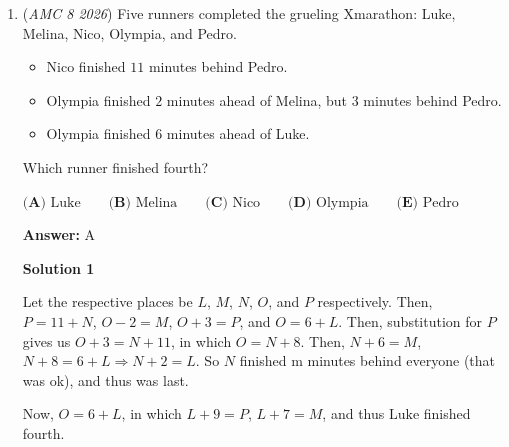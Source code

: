 \begin{enumerate}
 



\textbf{Solution 5}

Since $\sqrt[3]{81} = 3$, and $\sqrt{16} = 4$, the numerator of $\frac{\sqrt{16\sqrt{81}}}{\sqrt{81\sqrt{16}}}$ becomes $4 \cdot 3 = 12$. To find the denominator's value, we know that $\sqrt[3]{16} = 2$, and that $\sqrt{81} = 9$, the denominator of $\frac{\sqrt{16\sqrt{81}}}{\sqrt{81\sqrt{16}}}$ yields $9 \cdot 2 = 18$. We are left with $\frac{12}{18}$. After further simplification, our answer is $\boxed{ \textbf{(B) } \frac{2}{3}}$.~Ingeniouspeacock36

 


	\item (\textit{AMC 8 2026}) Five runners completed the grueling Xmarathon: Luke, Melina, Nico, Olympia, and Pedro.


 
            \begin{itemize}
        \item Nico finished $11$ minutes behind Pedro.
            \end{itemize}
            
            \begin{itemize}
        \item Olympia finished $2$ minutes ahead of Melina, but $3$ minutes behind Pedro.
            \end{itemize}
            
            \begin{itemize}
        \item Olympia finished $6$ minutes ahead of Luke.
            \end{itemize}
            Which runner finished fourth?


 $\textbf{(A) }\text{Luke} \qquad \textbf{(B) }\text{Melina} \qquad \textbf{(C) }\text{Nico} \qquad \textbf{(D) }\text{Olympia}\qquad \textbf{(E) }\text{Pedro}$

 \textbf{Answer: }A



\textbf{Solution 1}

Let the respective places be $L$, $M$, $N$, $O$, and $P$ respectively. Then, $P = 11+N$, $O-2 = M$, $O+3 = P$, and $O = 6+L$. Then, substitution for $P$ gives us $O+3 = N+11$, in which $O=N+8$. Then, $N+6 = M$, $N+8=6+L \Rightarrow N+2=L$. So $N$ finished m minutes behind everyone (that was ok), and thus was last.

 Now, $O=6+L$, in which $L+9 = P$, $L+7 = M$, and thus $\boxed{\text{Luke}}$ finished fourth.


\end{enumerate}
